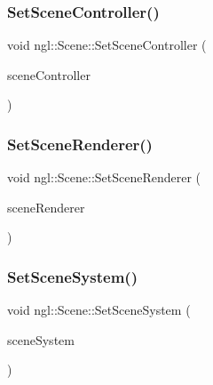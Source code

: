 \subsubsection{\texorpdfstring{Set\+Scene\+Controller()}{SetSceneController()}}
{\footnotesize\ttfamily void ngl\+::\+Scene\+::\+Set\+Scene\+Controller (\begin{DoxyParamCaption}\item[{\mbox{\hyperlink{classngl_1_1_scene_controller}{Scene\+Controller}} $\ast$}]{scene\+Controller }\end{DoxyParamCaption})}

\mbox{\label{classngl_1_1_scene_a578f692547e6f0494cd94c9327558c89}} 
\subsubsection{\texorpdfstring{Set\+Scene\+Renderer()}{SetSceneRenderer()}}
{\footnotesize\ttfamily void ngl\+::\+Scene\+::\+Set\+Scene\+Renderer (\begin{DoxyParamCaption}\item[{const \mbox{\hyperlink{classngl_1_1_scene_renderer}{Scene\+Renderer}} \&}]{scene\+Renderer }\end{DoxyParamCaption})}

\mbox{\label{classngl_1_1_scene_ae19b6ad3a75bad35434ba5f61fba7ebc}} 
\subsubsection{\texorpdfstring{Set\+Scene\+System()}{SetSceneSystem()}}
{\footnotesize\ttfamily void ngl\+::\+Scene\+::\+Set\+Scene\+System (\begin{DoxyParamCaption}\item[{\mbox{\hyperlink{classngl_1_1_scene_system}{Scene\+System}} $\ast$}]{scene\+System }\end{DoxyParamCaption})}

\mbox{\label{classngl_1_1_scene_ade4c87e08f19cef04daaef17e9ee4da9}} 
